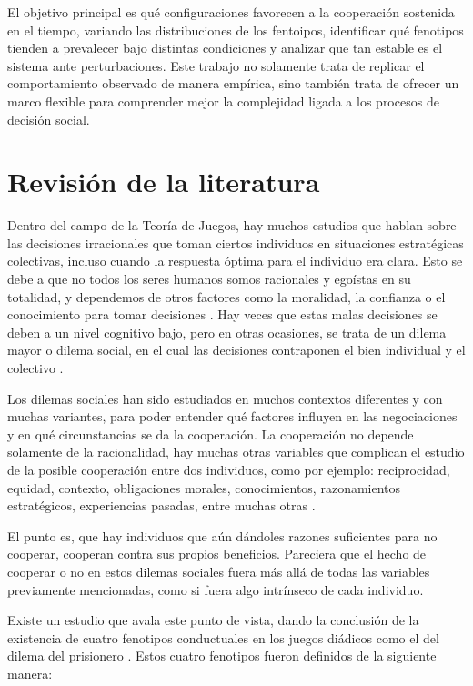 \documentclass[a4paper,12pt]{report}
\begin{document}
El objetivo principal es qué configuraciones favorecen a la cooperación sostenida en el tiempo, variando las distribuciones de los fentoipos, identificar qué fenotipos tienden a prevalecer bajo distintas condiciones y analizar que tan estable es el sistema ante perturbaciones. Este trabajo no solamente trata de replicar el comportamiento observado de manera empírica, sino también trata de ofrecer un marco flexible para comprender mejor la complejidad ligada a los procesos de decisión social.

\chapter{Revisión de la literatura}

Dentro del campo de la Teoría de Juegos, hay muchos estudios que hablan sobre las decisiones irracionales que toman ciertos individuos en situaciones estratégicas colectivas, incluso cuando la respuesta óptima para el individuo era clara. Esto se debe a que no todos los seres humanos somos racionales y egoístas en su totalidad, y dependemos de otros factores como la moralidad, la confianza o el conocimiento para tomar decisiones \cite{dawes1980social}. Hay veces que estas malas decisiones se deben a un nivel cognitivo bajo, pero en otras ocasiones, se trata de un dilema mayor o dilema social, en el cual las decisiones contraponen el bien individual y el colectivo \cite{kollock1998social}.

Los dilemas sociales han sido estudiados en muchos contextos diferentes y con muchas variantes, para poder entender qué factores influyen en las negociaciones y en qué circunstancias se da la cooperación. La cooperación no depende solamente de la racionalidad, hay muchas otras variables que complican el estudio de la posible cooperación entre dos individuos, como por ejemplo: reciprocidad, equidad, contexto, obligaciones morales, conocimientos, razonamientos estratégicos, experiencias pasadas, entre muchas otras \cite{sigmund2010calculus,camerer2003behavioral,kagel1995handbook,gintis2009game}.

El punto es, que hay individuos que aún dándoles razones suficientes para no cooperar, cooperan contra sus propios beneficios. Pareciera que el hecho de cooperar o no en estos dilemas sociales fuera más allá de todas las variables previamente mencionadas, como si fuera algo intrínseco de cada individuo.

Existe un estudio que avala este punto de vista, dando la conclusión de la existencia de cuatro fenotipos conductuales en los juegos diádicos como el del dilema del prisionero \cite{paper_principal}. Estos cuatro fenotipos fueron definidos de la siguiente manera:
\end{document}
